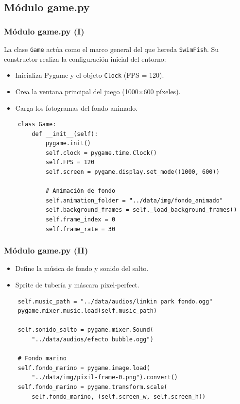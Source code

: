 \documentclass[
	11pt, %
]{beamer}
\begin{document}
\subsection{Módulo game.py}

\begin{frame}[fragile]
\frametitle{Módulo game.py (I)}

La clase \texttt{Game} actúa como el marco general del que hereda \texttt{SwimFish}.
Su constructor realiza la configuración inicial del entorno:

\begin{itemize}
    \item Inicializa Pygame y el objeto \texttt{Clock} (FPS = 120).
    \item Crea la ventana principal del juego (1000×600 píxeles).
    \item Carga los fotogramas del fondo animado.
\end{itemize}

\vspace{4pt}
{\scriptsize
\begin{verbatim}
    class Game:
        def __init__(self):
            pygame.init()
            self.clock = pygame.time.Clock()
            self.FPS = 120
            self.screen = pygame.display.set_mode((1000, 600))

            # Animación de fondo
            self.animation_folder = "../data/img/fondo_animado"
            self.background_frames = self._load_background_frames()
            self.frame_index = 0
            self.frame_rate = 30
\end{verbatim}
}
\end{frame}


\begin{frame}[fragile]
\frametitle{Módulo game.py (II)}

\begin{itemize}\setlength{\itemsep}{2pt}
    \item Define la música de fondo y sonido del salto.
    \item Sprite de tubería y máscara pixel-perfect.
\end{itemize}

{\scriptsize
\begin{verbatim}
    self.music_path = "../data/audios/linkin park fondo.ogg"
    pygame.mixer.music.load(self.music_path)

    self.sonido_salto = pygame.mixer.Sound(
        "../data/audios/efecto bubble.ogg")

    # Fondo marino
    self.fondo_marino = pygame.image.load(
        "../data/img/pixil-frame-0.png").convert()
    self.fondo_marino = pygame.transform.scale(
        self.fondo_marino, (self.screen_w, self.screen_h))
\end{verbatim}
}
\end{frame}
\end{document}
